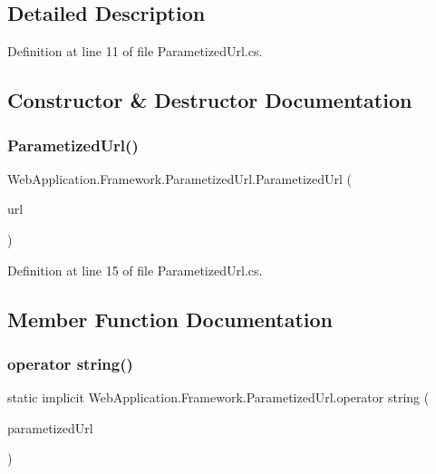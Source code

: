 \subsection{Detailed Description}


Definition at line 11 of file Parametized\+Url.\+cs.



\subsection{Constructor \& Destructor Documentation}
\mbox{\label{classWebApplication_1_1Framework_1_1ParametizedUrl_a19e00b2b069f2adc1bf0a0e97bebddf1}} 
\subsubsection{\texorpdfstring{ParametizedUrl()}{ParametizedUrl()}}
{\footnotesize\ttfamily Web\+Application.\+Framework.\+Parametized\+Url.\+Parametized\+Url (\begin{DoxyParamCaption}\item[{string}]{url }\end{DoxyParamCaption})}



Definition at line 15 of file Parametized\+Url.\+cs.



\subsection{Member Function Documentation}
\mbox{\label{classWebApplication_1_1Framework_1_1ParametizedUrl_af6af94dd3817a203be629e5703f2e588}} 
\subsubsection{\texorpdfstring{operator string()}{operator string()}}
{\footnotesize\ttfamily static implicit Web\+Application.\+Framework.\+Parametized\+Url.\+operator string (\begin{DoxyParamCaption}\item[{\mbox{\hyperlink{classWebApplication_1_1Framework_1_1ParametizedUrl}{Parametized\+Url}}}]{parametized\+Url }\end{DoxyParamCaption})\hspace{0.3cm}{\ttfamily [static]}}




